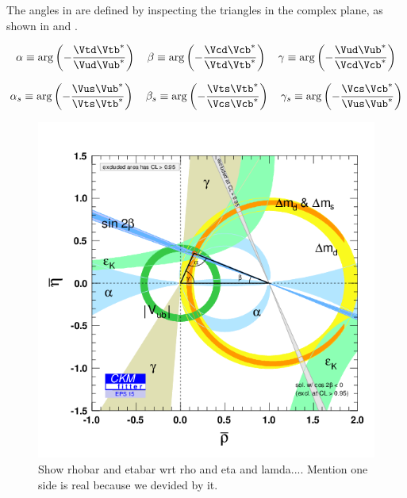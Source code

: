 \noindent The angles in  are defined by inspecting the triangles in the complex plane,
as shown in  and .

\begin{equation}
  \label{bdAnglesDef}
  \alpha \equiv \arg\left( -\frac{\Vtd\Vtb^*}{\Vud\Vub^*} \right)
  \quad
  \beta  \equiv \arg\left( -\frac{\Vcd\Vcb^*}{\Vtd\Vtb^*} \right)
  \quad
  \gamma \equiv \arg\left( -\frac{\Vud\Vub^*}{\Vcd\Vcb^*} \right)
\end{equation}

\begin{equation}
  \label{bsAnglesDef}
  \alpha_s \equiv \arg\left( -\frac{\Vus\Vub^*}{\Vts\Vtb^*} \right)
  \quad
  \beta_s \equiv \arg\left( -\frac{\Vts\Vtb^*}{\Vcs\Vcb^*} \right)
  \quad
  \gamma_s \equiv \arg\left( -\frac{\Vcs\Vcb^*}{\Vus\Vub^*} \right)
\end{equation}

\begin{figure}[h]
  \begin{center}
    \includegraphics[trim=0cm 0cm 0cm 0cm, clip=true, width=\textwidth]{Figures/Chapter1/rhoeta_large.png}
    \caption{Show rhobar and etabar wrt rho and eta and lamda.... Mention one side is real because we devided by it.}
    \label{unitarity_triangle}
  \end{center}
\end{figure}

